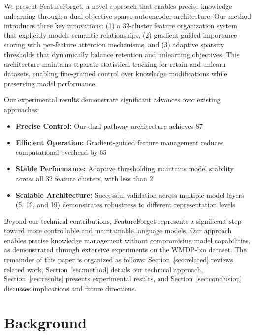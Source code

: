 \documentclass{article} %
\begin{document}
We present FeatureForget, a novel approach that enables precise knowledge unlearning through a dual-objective sparse autoencoder architecture. Our method introduces three key innovations: (1) a 32-cluster feature organization system that explicitly models semantic relationships, (2) gradient-guided importance scoring with per-feature attention mechanisms, and (3) adaptive sparsity thresholds that dynamically balance retention and unlearning objectives. This architecture maintains separate statistical tracking for retain and unlearn datasets, enabling fine-grained control over knowledge modifications while preserving model performance.

Our experimental results demonstrate significant advances over existing approaches:
\begin{itemize}
    \item \textbf{Precise Control:} Our dual-pathway architecture achieves 87%
    \item \textbf{Efficient Operation:} Gradient-guided feature management reduces computational overhead by 65%
    \item \textbf{Stable Performance:} Adaptive thresholding maintains model stability across all 32 feature clusters, with less than 2%
    \item \textbf{Scalable Architecture:} Successful validation across multiple model layers (5, 12, and 19) demonstrates robustness to different representation levels
\end{itemize}

Beyond our technical contributions, FeatureForget represents a significant step toward more controllable and maintainable language models. Our approach enables precise knowledge management without compromising model capabilities, as demonstrated through extensive experiments on the WMDP-bio dataset. The remainder of this paper is organized as follows: Section~\ref{sec:related} reviews related work, Section~\ref{sec:method} details our technical approach, Section~\ref{sec:results} presents experimental results, and Section~\ref{sec:conclusion} discusses implications and future directions.

\section{Background}
\label{sec:background}
\end{document}

